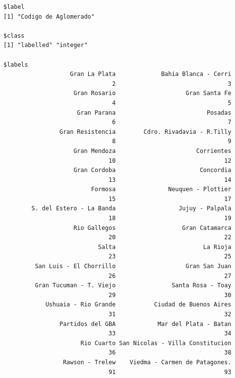 \documentclass[
]{article}
\newenvironment{Shaded}{\begin{snugshade}}{\end{snugshade}}
\newcommand{\FunctionTok}[1]{\textcolor[rgb]{0.13,0.29,0.53}{\textbf{#1}}}
\newcommand{\NormalTok}[1]{#1}
\newcommand{\SpecialCharTok}[1]{\textcolor[rgb]{0.81,0.36,0.00}{\textbf{#1}}}
\begin{document}
\begin{Shaded}
\end{Shaded}

\begin{verbatim}
$label
[1] "Codigo de Aglomerado"

$class
[1] "labelled" "integer" 

$labels
                   Gran La Plata             Bahia Blanca - Cerri 
                               2                                3 
                    Gran Rosario                    Gran Santa Fe 
                               4                                5 
                     Gran Parana                          Posadas 
                               6                                7 
                Gran Resistencia        Cdro. Rivadavia - R.Tilly 
                               8                                9 
                    Gran Mendoza                       Corrientes 
                              10                               12 
                    Gran Cordoba                        Concordia 
                              13                               14 
                         Formosa               Neuquen - Plottier 
                              15                               17 
        S. del Estero - La Banda                  Jujuy - Palpala 
                              18                               19 
                    Rio Gallegos                   Gran Catamarca 
                              20                               22 
                           Salta                         La Rioja 
                              23                               25 
         San Luis - El Chorrillo                    Gran San Juan 
                              26                               27 
         Gran Tucuman - T. Viejo                Santa Rosa - Toay 
                              29                               30 
            Ushuaia - Rio Grande           Ciudad de Buenos Aires 
                              31                               32 
                Partidos del GBA            Mar del Plata - Batan 
                              33                               34 
                      Rio Cuarto San Nicolas - Villa Constitucion 
                              36                               38 
                 Rawson - Trelew    Viedma - Carmen de Patagones. 
                              91                               93 
\end{verbatim}
\end{document}
